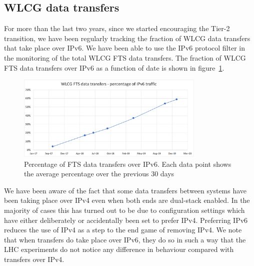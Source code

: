 
\subsection{WLCG data transfers}

For more than the last two years, since we started encouraging the Tier-2 transition, we have been regularly tracking the fraction of WLCG data transfers that take place over IPv6. We have been able to use the IPv6 protocol filter in the monitoring of the total WLCG FTS \cite{fts3} data transfers.
The fraction of WLCG FTS data transfers over IPv6 as a function of date is shown in  figure~\ref{fig:FTS}.
\begin{figure}[h]
\centering
\includegraphics[width=9cm]{FTS-IPv6}
\caption{Percentage of FTS data transfers over IPv6. Each data point shows the average percentage over the previous 30 days}
\label{fig:FTS}
\end{figure}
\par We have been aware of the fact that some data transfers between systems have been taking place over IPv4 even when both ends are dual-stack enabled. In the majority of cases this has turned out to be due to configuration settings which have either deliberately or accidentally been set to prefer IPv4. Preferring IPv6 reduces the use of IPv4 as a step to the end game of removing IPv4. We note that when transfers do take place over IPv6, they do so in such a way that the LHC experiments do not notice any difference in behaviour compared with transfers over IPv4.